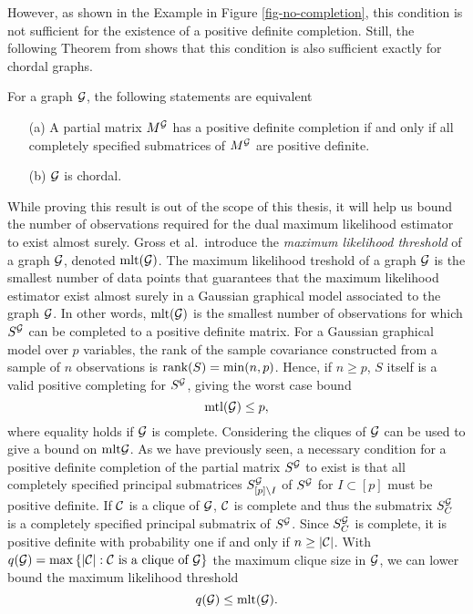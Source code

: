 However, as shown in the Example in Figure \ref{fig-no-completion}, this condition is not sufficient for the existence of a positive definite completion. Still, the following Theorem from \cite{GRONE1984109} shows that this condition is also sufficient exactly for chordal graphs.
\begin{theorem}
    For a graph ${\mathcal{G}}$, the following statements are equivalent
    \begin{itemize}
        \item[(a)] A partial matrix $M^{\mathcal{G}}$ has a positive definite completion if and only if all completely specified submatrices of $M^{\mathcal{G}}$ are positive definite.
        \item[(b)] ${\mathcal{G}}$ is chordal.
    \end{itemize}
\end{theorem}
While proving this result is out of the scope of this thesis, it will help us bound the number of observations required for the dual maximum likelihood estimator to exist almost surely. Gross et al.\,\cite{10.3150/16-BEJ881} introduce the \textit{maximum likelihood threshold} of a graph ${\mathcal{G}}$, denoted ${\textrm{mlt}}({\mathcal{G}})$. The maximum likelihood treshold of a graph ${\mathcal{G}}$ is the smallest number of data points that guarantees that the maximum likelihood estimator exist almost surely in a Gaussian graphical model associated to the graph ${\mathcal{G}}$. In other words, ${\textrm{mlt}}({\mathcal{G}})$ is the smallest number of observations for which $S^{\mathcal{G}}$ can be completed to a positive definite matrix. For a Gaussian graphical model over $p$ variables, the rank of the sample covariance constructed from a sample of $n$ observations is ${\textrm{rank}}(S) = \min(n, p)$. Hence, if $n \geq p$, $S$ itself is a valid positive completing for $S^{\mathcal{G}}$, giving the worst case bound
\begin{equation*}
    {\textrm{mtl}}({\mathcal{G}}) \leq p,
\end{equation*}
where equality holds if ${\mathcal{G}}$ is complete. Considering the cliques of ${\mathcal{G}}$ can be used to give a bound on ${\textrm{mlt}}{{\mathcal{G}}}$. As we have previously seen, a necessary condition for a positive definite completion of the partial matrix $S^{\mathcal{G}}$ to exist is that all completely specified principal submatrices $S^{\mathcal{G}}_{[p]\setminus I}$ of $S^{\mathcal{G}}$ for $I \subset [p]$ must be positive definite. If $\cal{C}$ is a clique of ${\mathcal{G}}$, $\cal{C}$ is complete and thus the submatrix $S^{\mathcal{G}}_C$ is a completely specified principal submatrix of $S^{\mathcal{G}}$. Since $S^{\mathcal{G}}_C$ is complete, it is positive definite with probability one if and only if $n \geq |\cal{C}|$. With $q({\mathcal{G}}) = \max {\left\{|\cal{C}| : \cal{C} {\textrm{ is a clique of }} {\mathcal{G}}\right\}}$ the maximum clique size in ${\mathcal{G}}$, we can lower bound the maximum likelihood threshold
\begin{equation*}
    q({\mathcal{G}}) \leq {\textrm{mlt}}({\mathcal{G}}).
\end{equation*}

